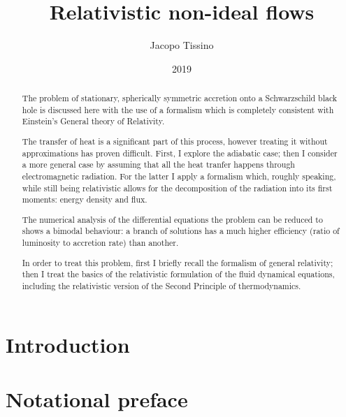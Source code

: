 \documentclass[a4paper, 11pt]{article}
\title{Relativistic non-ideal flows}
\author{Jacopo Tissino}
\date{2019}
\begin{document}



\begin{abstract}
The problem of stationary, spherically symmetric accretion onto a Schwarzschild black hole is discussed here with the use of a formalism which is completely consistent with Einstein's General theory of Relativity.

The transfer of heat is a significant part of this process, however treating it without approximations has proven difficult.
First, I explore the adiabatic case; then I consider a more general case by assuming that all the heat tranfer happens through electromagnetic radiation.
For the latter I apply a formalism which, roughly speaking, while still being relativistic allows for the decomposition of the radiation into its first moments: energy density and flux.

The numerical analysis of the differential equations the problem can be reduced to shows a bimodal behaviour: a branch of solutions has a much higher efficiency (ratio of luminosity to accretion rate) than another.

In order to treat this problem, first I briefly recall the formalism of general relativity; then I treat the basics of the relativistic formulation of the fluid dynamical equations, including the relativistic version of the Second Principle of thermodynamics.
\end{abstract}

\setcounter{tocdepth}{2}
\tableofcontents

\section{Introduction} \label{sec:introduction}


\section{Notational preface} \label{sec:notational-preface}

\end{document}
